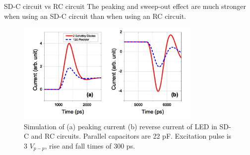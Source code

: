 \documentclass[mathserif]{beamer}
\begin{document}
    \begin{frame}{SD-C circuit vs RC circuit}
        \pause
        The peaking and sweep-out effect are much stronger when using an SD-C circuit than when using an RC circuit.
        \pause
        \begin{figure}
            \centering
            \includegraphics[width=0.8\textwidth]{peakingSweepOutSimulation.png}
            \caption{Simulation of (a) peaking current (b) reverse current of LED in SD-C and RC circuits. Parallel capacitors are 22 pF. Excitation pulse is 3 $V_{p-p}$, rise and fall times of 300 ps.}
        \end{figure}
    \end{frame}
\end{document}
